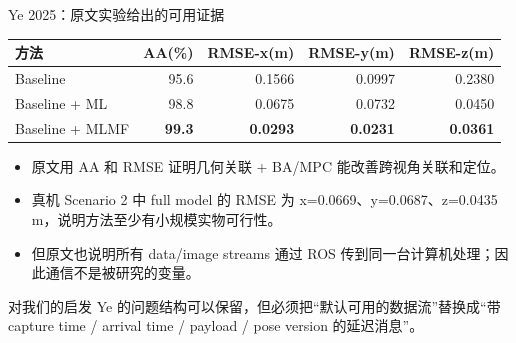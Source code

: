 \documentclass[aspectratio=169,xcolor=dvipsnames]{beamer}
\newcommand{\metric}[1]{\textbf{#1}}
\begin{document}
\begin{frame}{Ye 2025：原文实验给出的可用证据}
\scriptsize
\begin{tabularx}{\linewidth}{lrrrr}
\toprule
方法 & AA(\%) & RMSE-x(m) & RMSE-y(m) & RMSE-z(m) \\
\midrule
Baseline & 95.6 & 0.1566 & 0.0997 & 0.2380 \\
Baseline + ML & 98.8 & 0.0675 & 0.0732 & 0.0450 \\
Baseline + MLMF & \metric{99.3} & \metric{0.0293} & \metric{0.0231} & \metric{0.0361} \\
\bottomrule
\end{tabularx}

\vspace{2mm}
\begin{itemize}
  \item 原文用 AA 和 RMSE 证明几何关联 + BA/MPC 能改善跨视角关联和定位。
  \item 真机 Scenario 2 中 full model 的 RMSE 为 x=0.0669、y=0.0687、z=0.0435 m，说明方法至少有小规模实物可行性。
  \item 但原文也说明所有 data/image streams 通过 ROS 传到同一台计算机处理；因此通信不是被研究的变量。
\end{itemize}

\begin{alertblock}{对我们的启发}
Ye 的问题结构可以保留，但必须把“默认可用的数据流”替换成“带 capture time / arrival time / payload / pose version 的延迟消息”。
\end{alertblock}
\end{frame}
\end{document}
